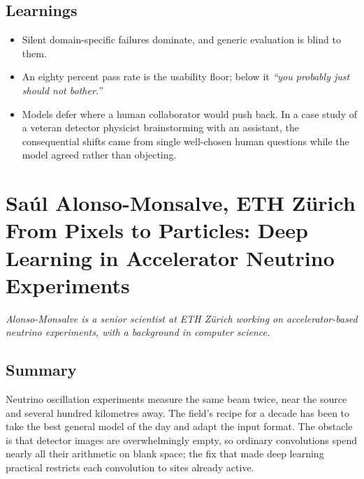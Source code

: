 \documentclass[11pt]{article}
\begin{document}
\subsection*{Learnings}
\begin{itemize}
    \item Silent domain-specific failures dominate, and generic evaluation is blind to them.
    \item An eighty percent pass rate is the usability floor; below it \emph{``you probably just should not bother.''}
    \item Models defer where a human collaborator would push back. In a case study of a veteran detector physicist brainstorming with an assistant, the consequential shifts came from single well-chosen human questions while the model agreed rather than objecting.
\end{itemize}

\section{Sa\'ul Alonso-Monsalve, ETH Z\"urich\\
{\large From Pixels to Particles: Deep Learning in Accelerator Neutrino Experiments}}

\emph{Alonso-Monsalve is a senior scientist at ETH Z\"urich working on accelerator-based neutrino experiments, with a background in computer science.}

\subsection*{Summary}
Neutrino oscillation experiments measure the same beam twice, near the source and several hundred kilometres away. The field's recipe for a decade has been to take the best general model of the day and adapt the input format. The obstacle is that detector images are overwhelmingly empty, so ordinary convolutions spend nearly all their arithmetic on blank space; the fix that made deep learning practical restricts each convolution to sites already active.
\end{document}
